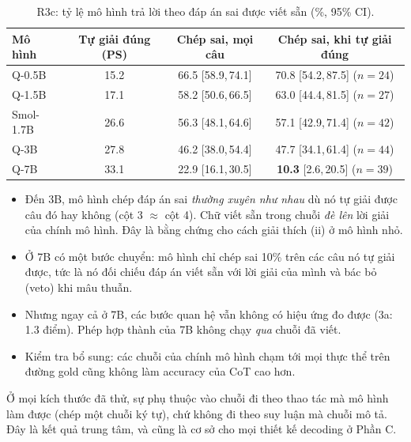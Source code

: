 \documentclass[11pt]{article}
\newcommand{\ci}[2]{{\scriptsize[#1,\,#2]}}
\begin{document}
\begin{table}[h]
\centering\small
\caption{R3c: tỷ lệ mô hình trả lời theo đáp án sai được viết sẵn (\%, 95\% CI).}
\label{tab:copywrong}
\begin{tabular}{lccc}
\toprule
Mô hình & Tự giải đúng (PS) & Chép sai, mọi câu & Chép sai, khi tự giải đúng \\
\midrule
Q-0.5B & 15.2 & 66.5 \ci{58.9}{74.1} & 70.8 \ci{54.2}{87.5} ($n=24$) \\
Q-1.5B & 17.1 & 58.2 \ci{50.6}{66.5} & 63.0 \ci{44.4}{81.5} ($n=27$) \\
Smol-1.7B & 26.6 & 56.3 \ci{48.1}{64.6} & 57.1 \ci{42.9}{71.4} ($n=42$) \\
Q-3B & 27.8 & 46.2 \ci{38.0}{54.4} & 47.7 \ci{34.1}{61.4} ($n=44$) \\
Q-7B & 33.1 & 22.9 \ci{16.1}{30.5} & \textbf{10.3} \ci{2.6}{20.5} ($n=39$) \\
\bottomrule
\end{tabular}
\end{table}

\begin{cachdoc}
\begin{itemize}[leftmargin=*,itemsep=1pt]
\item Đến 3B, mô hình chép đáp án sai \emph{thường xuyên như nhau} dù nó tự giải được câu đó hay
  không (cột 3 $\approx$ cột 4). Chữ viết sẵn trong chuỗi \emph{đè lên} lời giải của chính mô hình.
  Đây là bằng chứng cho cách giải thích (ii) ở mô hình nhỏ.
\item Ở 7B có một bước chuyển: mô hình chỉ chép sai 10\% trên các câu nó tự giải được, tức là nó
  đối chiếu đáp án viết sẵn với lời giải của mình và bác bỏ (veto) khi mâu thuẫn.
\item Nhưng ngay cả ở 7B, các bước quan hệ vẫn không có hiệu ứng đo được (3a: 1.3 điểm). Phép hợp
  thành của 7B không chạy \emph{qua} chuỗi đã viết.
\item Kiểm tra bổ sung: các chuỗi của chính mô hình chạm tới mọi thực thể trên đường gold cũng
  không làm accuracy của CoT cao hơn.
\end{itemize}
\end{cachdoc}

\begin{ketluan}
Ở mọi kích thước đã thử, sự phụ thuộc vào chuỗi đi theo thao tác mà mô hình làm được (chép một chuỗi
ký tự), chứ không đi theo suy luận mà chuỗi mô tả. Đây là kết quả trung tâm, và cũng là cơ sở cho
mọi thiết kế decoding ở Phần C.
\end{ketluan}
\end{document}
